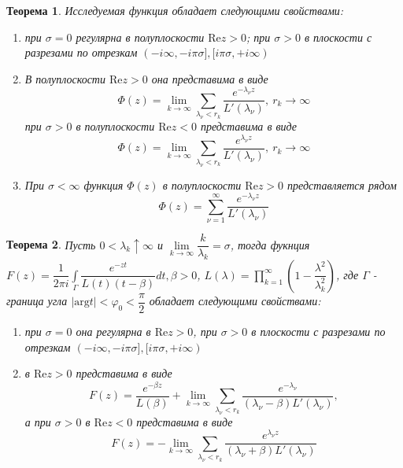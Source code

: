 \documentclass[9pt]{article}
\newtheorem{theorem}{Теорема} %
\begin{document}
			\begin{theorem}
				Исследуемая функция обладает следующими свойствами:
				\begin{enumerate}
					\item при $\sigma = 0$ регулярна в полуплоскости $\mathrm{Re} z > 0$;  при $\sigma > 0$ в плоскости с разрезами по отрезкам $(-i\infty, -i\pi\sigma], [i\pi\sigma, +i\infty)$
					\item В полуплоскости $\mathrm{Re} z > 0$ она представима в виде
					$$
					\Phi(z) = \lim\limits_{k\to\infty} \sum\limits_{\lambda_\nu < r_k} \dfrac{e^{-\lambda_\nu z}}{L'(\lambda_\nu)}, \ r_k \to \infty
					$$
					при $\sigma > 0$ в полуплоскости  $\mathrm{Re} z < 0$ представима в виде
					$$
					\Phi(z) = \lim\limits_{k\to\infty} \sum\limits_{\lambda_\nu < r_k} \dfrac{e^{\lambda_\nu z}}{L'(\lambda_\nu)}, \ r_k \to \infty
					$$
					\item При $\sigma < \infty$ функция $\Phi(z)$  в полуплоскости $\mathrm{Re} z > 0$ представляется рядом
					$$
					\Phi(z) = \sum\limits_{\nu=1}^{\infty} \dfrac{e^{-\lambda_\nu z}}{L'(\lambda_\nu)}
					$$
									\end{enumerate}
			\end{theorem}
			
			\begin{theorem}
				Пусть $ 0 < \lambda_k \uparrow \infty$ и $\lim\limits_{k\to\infty} \dfrac{k}{\lambda_k} = \sigma$, тогда фукнция $F(z) = \dfrac{1}{2\pi i} \int\limits_{\Gamma} \dfrac{e^{-zt}}{L(t)(t - \beta)} dt, \beta > 0$, $L(\lambda) = \prod\limits_{k=1}^{\infty} \left(1 - \dfrac{\lambda^2}{\lambda_k^2}\right)$, где $\Gamma$ - граница угла $|\mathrm{arg} t| < \varphi_0 < \dfrac\pi2$ обладает следующими свойствами:
				\begin{enumerate}
					\item при $\sigma = 0$ она регулярна в $\mathrm{Re} z > 0$, при $\sigma > 0$  в плоскости с разрезами по отрезкам $(-i\infty, -i\pi\sigma], [i\pi\sigma, +i\infty)$
					\item в $\mathrm{Re} z > 0$ представима в виде
					$$
					F(z) = \dfrac{e^{-\beta z}}{L(\beta)} + \lim\limits_{k\to\infty} \sum\limits_{\lambda_\nu < r_k} \dfrac{e^{-\lambda_\nu}}{(\lambda_\nu - \beta)L'(\lambda_\nu)},
					$$
					а при $\sigma > 0$ в $\mathrm{Re}z < 0$ представима в виде
					$$
					F(z) = -\lim\limits_{k\to\infty}\sum\limits_{\lambda_\nu < r_k} \dfrac{e^{\lambda_\nu z}}{(\lambda_\nu + \beta) L'(\lambda_\nu)}
					$$
				\end{enumerate}
			\end{theorem}
\end{document}
